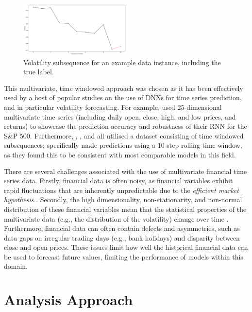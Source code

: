 \documentclass[a4paper, 11pt]{report}
\begin{document}
    \begin{figure}[ht]
        \centering
        \includegraphics[width=0.5\textwidth]{volatility-subsequence.png}
        \caption{\centering Volatility subsequence for an example data instance, including the true label.}
        \label{fig: volatility-subsequence}
    \end{figure}


    This multivariate, time windowed approach was chosen as it has been effectively used by a host of popular studies on the use of DNNs for time series prediction, and in particular volatility forecasting. For example, \citet{xiong-2016} used $25$-dimensional multivariate time series (including daily open, close, high, and low prices, and returns) to showcase the prediction accuracy and robustness of their RNN for the S\&P 500. Furthermore, \citet{xiong-2016}, \citet{bucci-2020}, and \citet{rodikov-2022} all utilised a dataset consisting of time windowed subsequences; \citet{xiong-2016} specifically made predictions using a $10$-step rolling time window, as they found this to be consistent with most comparable models in this field.

    There are several challenges associated with the use of multivariate financial time series data. Firstly, financial data is often noisy, as financial variables exhibit rapid fluctuations that are inherently unpredictable due to the \emph{efficient market hypothesis} \citep{cavalcante-2016}. Secondly, the high dimensionality, non-stationarity, and non-normal distribution of these financial variables mean that the statistical properties of the multivariate data (e.g., the distribution of the volatility) change over time \citep{fryzlewicz-2019}. Furthermore, financial data can often contain defects and asymmetries, such as data gaps on irregular trading days (e.g., bank holidays) and disparity between close and open prices. These issues limit how well the historical financial data can be used to forecast future values, limiting the performance of models within this domain.


    \section{Analysis Approach}
    \label{section: metrics}
\end{document}
